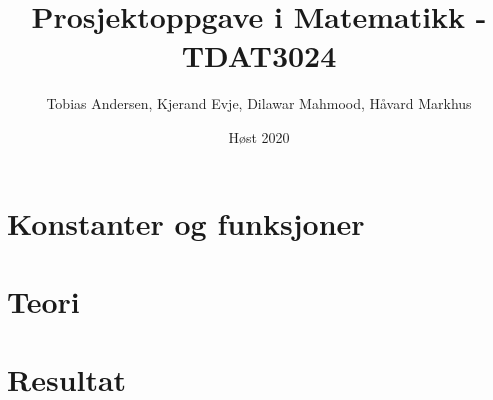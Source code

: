 \documentclass{article}
\title{Prosjektoppgave i Matematikk - TDAT3024}
\author{Tobias Andersen, Kjerand Evje, Dilawar Mahmood, Håvard Markhus}
\date{Høst 2020}
\begin{document}
\maketitle
\newpage
\tableofcontents
\newpage
\section{Konstanter og funksjoner}\label{nomenklatur}

\newpage
\section{Teori}


\section{Resultat}







\newpage

 

\end{document}
